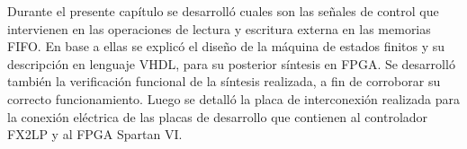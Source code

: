 Durante el presente capítulo se desarrolló cuales son las señales de control que intervienen en las operaciones de lectura y escritura externa en las memorias FIFO. En base a ellas se explicó el diseño de la máquina de estados finitos y su descripción en lenguaje VHDL, para su posterior síntesis en FPGA. Se desarrolló también la verificación funcional de la síntesis realizada, a fin de corroborar su correcto funcionamiento.
Luego se detalló la placa de interconexión realizada para la conexión eléctrica de las placas de desarrollo que contienen al controlador FX2LP y al FPGA Spartan VI.